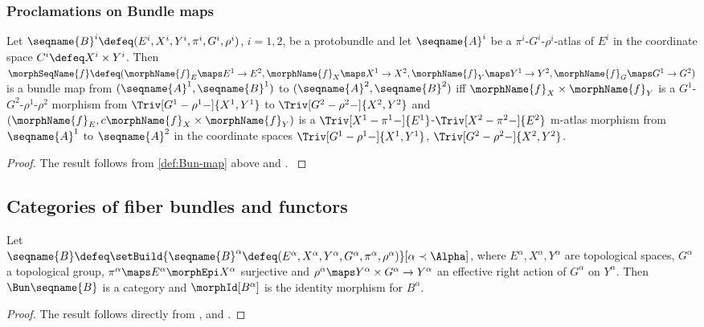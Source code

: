 \documentclass{article}
\begin{document}
\subsubsection{Proclamations on Bundle maps}
\begin{lemma}
\label{lem:Bun-map}
Let
$
  \seqname{B}^i
  \defeq
  (
    E^i,
    X^i,
    Y^i,
    \pi^i,
    G^i,
    \rho^i
  )
$, $i=1,2$, be a protobundle and let
$\seqname{A}^i$ be a $\pi^i$-$G^i$-$\rho^i$-atlas of $E^i$ in the
coordinate space
\nobreaks
  {{
    $C^i \defeq X^i \times Y^i$.
  }}
Then
$
  \morphSeqName{f}
  \defeq
  (
    \morphName{f}_E \maps E^1 \to E^2,
    \morphName{f}_X \maps X^1 \to X^2,
    \morphName{f}_Y \maps Y^1 \to Y^2,
    \morphName{f}_G \maps G^1 \to G^2
  )
$
is a bundle map from $(\seqname{A}^1,\seqname{B}^1)$ to
$(\seqname{A}^2,\seqname{B}^2)$ iff
$\morphName{f}_X \times \morphName{f}_Y$ is a
$G^1$-$G^2$-$\rho^1$-$\rho^2$ morphism from
$\Triv[G^1-\rho^1-]{X^1,Y^1}$ to $\Triv[G^2-\rho^2-]{X^2,Y^2}$ and
$(\morphName{f}_E,c \morphName{f}_X \times \morphName{f}_Y)$ is a
$\Triv[X^1-\pi^1-]{E^1}$-$\Triv[X^2-\pi^2-]{E^2}$ m-atlas morphism from
$\seqname{A}^1$ to $\seqname{A}^2$ in the coordinate spaces
$\Triv[G^1-\rho^1-]{X^1,Y^1}$, $\Triv[G^2-\rho^2-]{X^2,Y^2}$.

\begin{proof}
The result follows from \cref{def:Bun-map} above and
{
  \showlabelsinline
  .
}
\end{proof}
\end{lemma}

\subsection{Categories of fiber bundles and functors}
{
  \showlabelsinline
  \label{sub:Fib-cat}
}
\begin{theorem}
\label{the:Bun}
Let \\
$
  \seqname{B}
  \defeq
  \setBuild
    {{
      \seqname{B}^\alpha \defeq
      (
        E^\alpha,
        X^\alpha,
        Y^\alpha,
        G^\alpha,
        \pi^\alpha,
        \rho^\alpha
      )
    }}%
    [
      \alpha \prec \Alpha
    ]
$,
where $E^\alpha, X^\alpha, Y^\alpha$ are topological spaces,
$G^\alpha$ a topological group,
$\pi^\alpha \maps E^\alpha \morphEpi X^\alpha$ surjective and
$\rho^\alpha \maps Y^\alpha \times G^\alpha \to Y^\alpha$
an effective right action of $G^\alpha$ on $Y^\alpha$. Then
$\Bun \seqname{B}$ is a category and $\morphId[{B^\alpha}]$ is the identity
morphism for $B^\alpha$.

\begin{proof}
{
  \showlabelsinline
  The result follows directly from ,
}
 and .
\end{proof}
\end{theorem}
\end{document}
